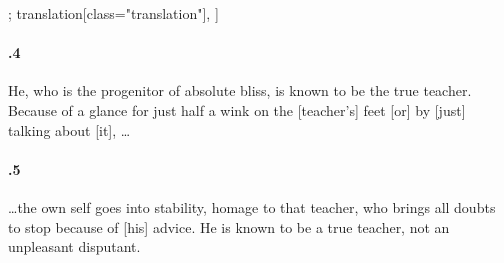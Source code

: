 \begin{alignment}[
  texts=edition[class="edition"];
  translation[class="translation"],
  ]
\begin{translation}
\begin{tlate}
\paragraph{.4} He, who is the progenitor of absolute bliss, is known to be the true teacher. Because of a glance for just half a wink on the [teacher's] feet [or] by [just] talking about [it], \ldots

\paragraph{.5} \ldots the own self goes into stability, homage to that teacher, who brings all doubts to stop because of [his] advice. He is known to be a true teacher, not an unpleasant disputant.
    \end{tlate}
  \end{translation}
\end{alignment}
\pagebreak %

